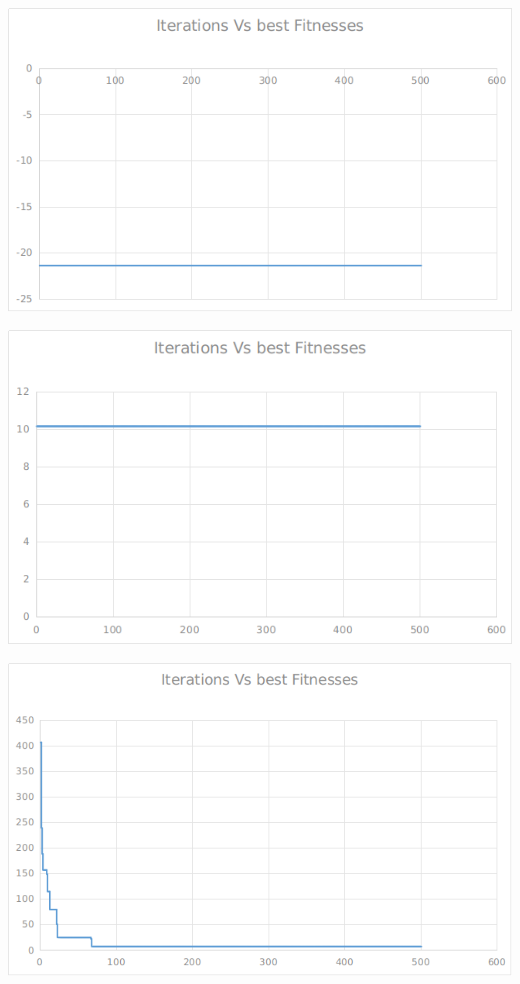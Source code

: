 \documentclass[12pt]{article}
\begin{document}
				\hfill
				\begin{minipage}{0.6\linewidth}
					\includegraphics[width=\linewidth]{6.png}
				\end{minipage}
				\begin{minipage}{0.6\linewidth}
					\includegraphics[width=\linewidth]{7.png}
				\end{minipage}
				\hfill
				\begin{minipage}{0.6\linewidth}
					\includegraphics[width=\linewidth]{8.png}
				\end{minipage}
\end{document}
